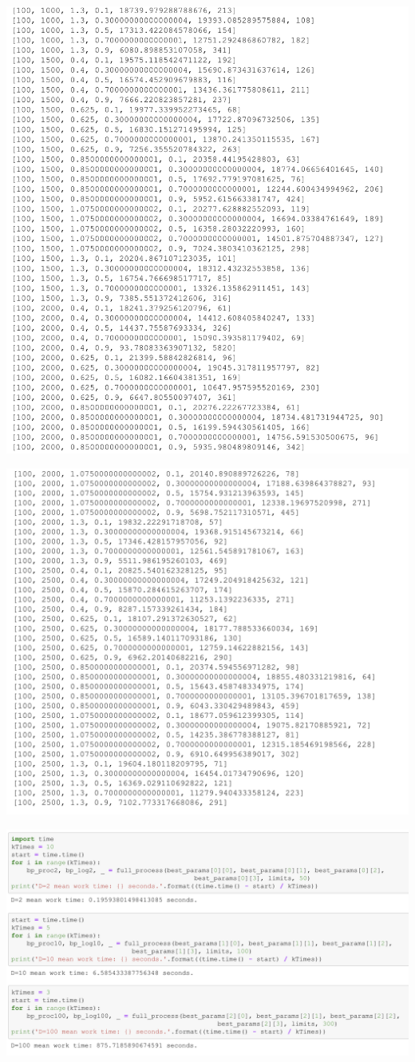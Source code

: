 \documentclass[10pt,a4paper]{article}
\begin{document}
	\includegraphics[width= \textwidth, keepaspectratio]{img/15}
	
	\includegraphics[width= 0.9 \textwidth, keepaspectratio]{img/16}
	
	\includegraphics[width= 0.9 \textwidth, keepaspectratio]{img/17}
	
\end{document}
